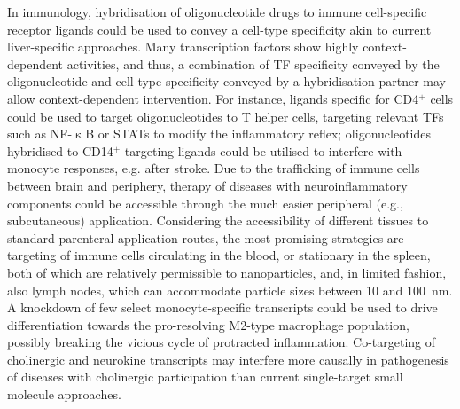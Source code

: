 In immunology, hybridisation of oligonucleotide drugs to immune cell-specific receptor ligands could be used to convey a cell-type specificity akin to current liver-specific approaches. Many transcription factors show highly context-dependent activities,\cite{Hamada2020} and thus, a combination of TF specificity conveyed by the oligonucleotide and cell type specificity conveyed by a hybridisation partner may allow context-dependent intervention. For instance, ligands specific for CD4$^+$ cells could be used to target oligonucleotides to T helper cells, targeting relevant TFs such as NF-$\upkappa$B or STATs to modify the inflammatory reflex; oligonucleotides hybridised to CD14$^+$-targeting ligands could be utilised to interfere with monocyte responses, e.g. after stroke. Due to the trafficking of immune cells between brain and periphery, therapy of diseases with neuroinflammatory components could be accessible through the much easier peripheral (e.g., subcutaneous) application. Considering the accessibility of different tissues to standard parenteral application routes, the most promising strategies are targeting of immune cells circulating in the blood, or stationary in the spleen, both of which are relatively permissible to nanoparticles,\cite{Gullotti2009} and, in limited fashion, also lymph nodes, which can accommodate particle sizes between 10 and \SI{100}{\nano\metre}.\cite{Schudel2019} A knockdown of few select monocyte-specific transcripts could be used to drive differentiation towards the pro-resolving M2-type macrophage population,\cite{Panizzi2010} possibly breaking the vicious cycle of protracted inflammation. Co-targeting of cholinergic and neurokine transcripts may interfere more causally in pathogenesis of diseases with cholinergic participation than current single-target small molecule approaches.

